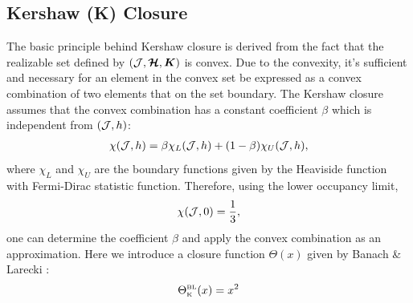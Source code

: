\subsection{Kershaw (K) Closure}

The basic principle behind Kershaw closure is derived from the fact that the realizable set defined by $(\mathcal{J}, \boldsymbol{\mathcal{H}}, \boldsymbol{K})$ is convex.
Due to the convexity, it's sufficient and necessary for an element in the convex set be expressed as a convex combination of two elements that on the set boundary.
The Kershaw closure assumes that the convex combination has a constant coefficient $\beta$ which is independent from $(\mathcal{J},h)$:
\begin{align}
 \chi(\mathcal{J},h) = \beta  \chi_{L}(\mathcal{J},h) + (1-\beta) \chi_{U}(\mathcal{J},h),
\end{align}
where $\chi_{L}$ and $\chi_{U}$ are the boundary functions given by the Heaviside function with Fermi-Dirac statistic function.
Therefore, using the lower occupancy limit,
\begin{align}
 \chi(\mathcal{J},0) = \dfrac{1}{3},
\end{align}
one can determine the coefficient $\beta$ and apply the convex combination as an approximation.
Here we introduce a closure function $\Theta(x)$ given by Banach \& Larecki \cite{banachLarecki_2017a}:
\begin{equation}
  \Theta_{\mbox{\tiny K}}^{\mbox{\tiny BL}}(x)=x^{2}
\end{equation}

